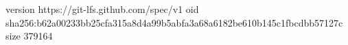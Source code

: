 version https://git-lfs.github.com/spec/v1
oid sha256:b62a00233bb25cfa315a8d4a99b5abfa3a68a6182be610b145c1fbcdbb57127c
size 379164
